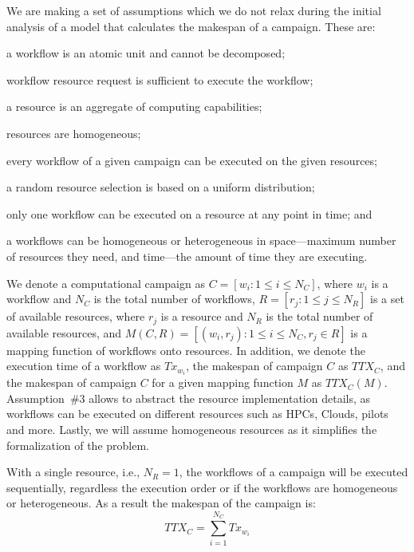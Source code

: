 We are making a set of assumptions which we do not relax during the initial analysis of a model that calculates the makespan of a campaign.
These are:
\begin{inparaenum}[(1)]
    \item a workflow is an atomic unit and cannot be decomposed;
    \item workflow resource request is sufficient to execute the workflow;
    \item a resource is an aggregate of computing capabilities;
    \item resources are homogeneous;
    \item every workflow of a given campaign can be executed on the given resources;
    \item a random resource selection is based on a uniform distribution;
    \item only one workflow can be executed on a resource at any point in time; and
    \item a workflows can be homogeneous or heterogeneous in space---maximum number of resources they need, and time---the amount of time they are executing.
\end{inparaenum}

We denote a computational campaign as $C = [w_{i}: 1 \leq i \leq N_{C}]$, where $w_{i}$ is a workflow and $N_{C}$ is the total number of workflows, $R = [ r_{j}: 1 \leq j \leq N_{R}]$ is a set of available resources, where $r_{j}$ is a resource and $N_{R}$ is the total number of available resources, and $ M(C,R) = [(w_i, r_j): 1 \leq i \leq N_{C}, r_j \in R] $ is a mapping function of workflows onto resources.
In addition, we denote the execution time of a workflow as $Tx_{w_{i}}$, the makespan of campaign $C$ as $TTX_{C}$, and the makespan of campaign $C$ for a given mapping function $ M $ as $TTX_{C}(M)$.
Assumption~\#3 allows to abstract the resource implementation details, as workflows can be executed on different resources such as HPCs, Clouds, pilots and more. 
Lastly, we will assume homogeneous resources as it simplifies the formalization of the problem.

With a single resource, i.e., $N_{R} = 1$, the workflows of a campaign will be executed sequentially, regardless the execution order or if the workflows are homogeneous or heterogeneous.
As a result the makespan of the campaign is:
\begin{equation}
   TTX_{C} = \sum_{i=1}^{N_{C}}Tx_{w_{i}} 
\end{equation}

